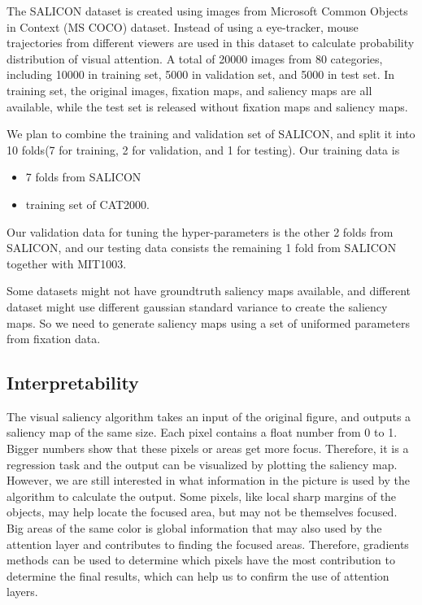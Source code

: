 \documentclass[12pt]{article}
\begin{document}
The SALICON dataset is created using images from Microsoft Common Objects in Context (MS COCO) dataset\cite{linMicrosoftCOCOCommon2015}.
Instead of using a eye-tracker, mouse trajectories from different viewers are used in this dataset 
to calculate probability distribution of visual attention. A total of 20000 images from 80 categories, including
10000 in training set, 5000 in validation set, and 5000 in test set.
In training set, the original images, fixation maps, and saliency maps are all available, while 
the test set is released without fixation maps and saliency maps.


We plan to combine the training and validation set of SALICON, 
and split it into 10 folds(7 for training, 2 for validation, and 1 for testing). 
Our training data is
\begin{itemize}
    \item 7 folds from SALICON
    \item training set of CAT2000.
\end{itemize}
Our validation data for tuning the hyper-parameters is the other 2 folds from SALICON, 
and our testing data consists the remaining 1 fold from SALICON together with MIT1003.

Some datasets might not have groundtruth saliency maps available, and different dataset might use different gaussian standard variance to create the saliency maps.
So we need to generate saliency maps using a set of uniformed parameters from fixation data.


\subsection{Interpretability}

The visual saliency algorithm takes an input of the original figure, and outputs a saliency map of the same size. Each pixel contains a float number from 0 to 1. Bigger numbers show that these pixels or areas get more focus. Therefore, it is a regression task and the output can be visualized by plotting the saliency map.
However, we are still interested in what information in the picture is used by the algorithm to calculate the output. Some pixels, like local sharp margins of the objects, may help locate the focused area, but may not be themselves focused. Big areas of the same color is global information that may also used by the attention layer and contributes to finding the focused areas.
Therefore, gradients methods \cite{sundararajan2017axiomatic} can be used to determine which pixels have the most contribution to determine the final results, which can help us to confirm the use of attention layers.
\end{document}
